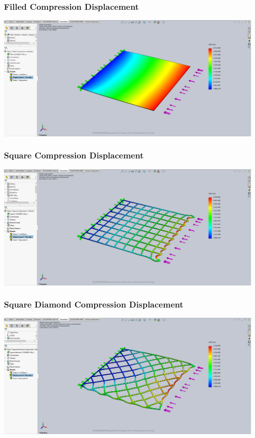 \documentclass[12pt, letterpaper]{article}
\begin{document}
\begin{singlespace}
\subsubsection{Filled Compression Displacement}
\label{ap:f-c-d}
\includegraphics[width=0.8\linewidth]{./graphs/compression/filled-compression-displacement}

\subsubsection{Square Compression Displacement}
\label{ap:s-c-d}
\includegraphics[width=0.8\linewidth]{./graphs/compression/square-compression-displacement}

\subsubsection{Square Diamond Compression Displacement}
\label{ap:sd-c-d}
\includegraphics[width=0.8\linewidth]{./graphs/compression/square-diamond-compression-displacement}


\end{singlespace}
\end{document}

